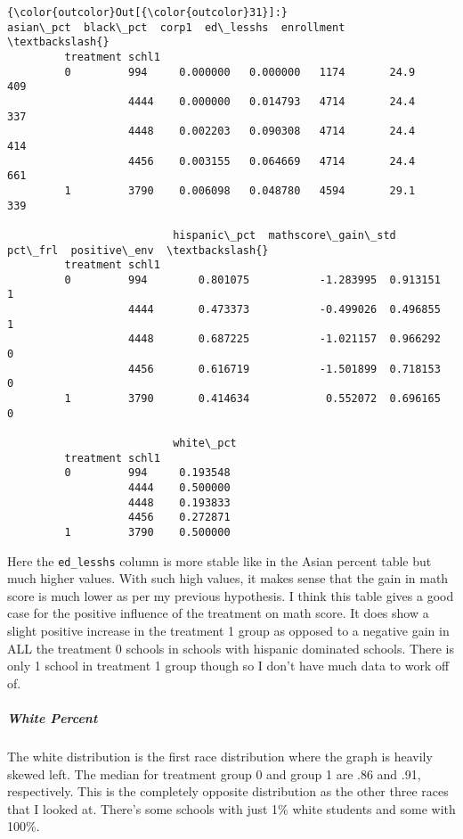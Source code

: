 \documentclass[11pt]{article}
\begin{document}
\begin{Verbatim}[commandchars=\\\{\}]
{\color{outcolor}Out[{\color{outcolor}31}]:}                  asian\_pct  black\_pct  corp1  ed\_lesshs  enrollment  \textbackslash{}
         treatment schl1                                                       
         0         994     0.000000   0.000000   1174       24.9         409   
                   4444    0.000000   0.014793   4714       24.4         337   
                   4448    0.002203   0.090308   4714       24.4         414   
                   4456    0.003155   0.064669   4714       24.4         661   
         1         3790    0.006098   0.048780   4594       29.1         339   
         
                          hispanic\_pct  mathscore\_gain\_std   pct\_frl  positive\_env  \textbackslash{}
         treatment schl1                                                             
         0         994        0.801075           -1.283995  0.913151             1   
                   4444       0.473373           -0.499026  0.496855             1   
                   4448       0.687225           -1.021157  0.966292             0   
                   4456       0.616719           -1.501899  0.718153             0   
         1         3790       0.414634            0.552072  0.696165             0   
         
                          white\_pct  
         treatment schl1             
         0         994     0.193548  
                   4444    0.500000  
                   4448    0.193833  
                   4456    0.272871  
         1         3790    0.500000  
\end{Verbatim}
            
    Here the \texttt{ed\_lesshs} column is more stable like in the Asian
percent table but much higher values. With such high values, it makes
sense that the gain in math score is much lower as per my previous
hypothesis. I think this table gives a good case for the positive
influence of the treatment on math score. It does show a slight positive
increase in the treatment 1 group as opposed to a negative gain in ALL
the treatment 0 schools in schools with hispanic dominated schools.
There is only 1 school in treatment 1 group though so I don't have much
data to work off of.

    \subparagraph{White Percent}\label{white-percent}

The white distribution is the first race distribution where the graph is
heavily skewed left. The median for treatment group 0 and group 1 are
.86 and .91, respectively. This is the completely opposite distribution
as the other three races that I looked at. There's some schools with
just 1\% white students and some with 100\%.
\end{document}
